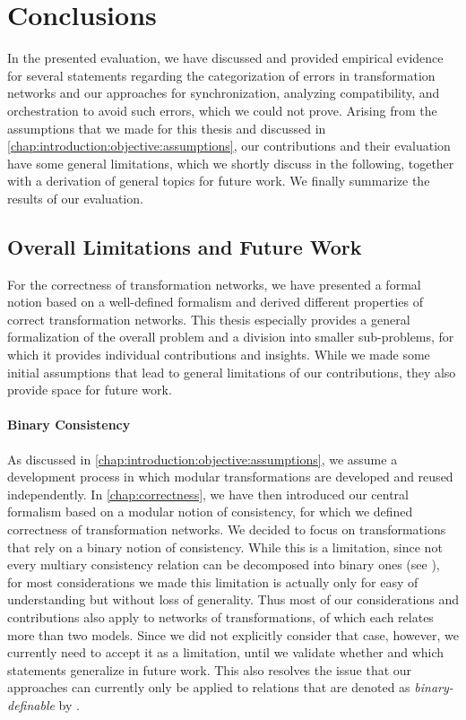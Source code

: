 \section{Conclusions}

In the presented evaluation, we have discussed and provided empirical evidence for several statements regarding the categorization of errors in transformation networks and our approaches for synchronization, analyzing compatibility, and orchestration to avoid such errors, which we could not prove.
Arising from the assumptions that we made for this thesis and discussed in \autoref{chap:introduction:objective:assumptions}, our contributions and their evaluation have some general limitations, which we shortly discuss in the following, together with a derivation of general topics for future work.
We finally summarize the results of our evaluation.


\subsection{Overall Limitations and Future Work}

For the correctness of transformation networks, we have presented a formal notion based on a well-defined formalism and derived different properties of correct transformation networks.
This thesis especially provides a general formalization of the overall problem and a division into smaller sub-problems, for which it provides individual contributions and insights.
While we made some initial assumptions that lead to general limitations of our contributions, they also provide space for future work.

\paragraph{Binary Consistency}
As discussed in \autoref{chap:introduction:objective:assumptions}, we assume a development process in which modular transformations are developed and reused independently.
In \autoref{chap:correctness}, we have then introduced our central formalism based on a modular notion of consistency, for which we defined correctness of transformation networks.
We decided to focus on transformations that rely on a binary notion of consistency.
While this is a limitation, since not every multiary consistency relation can be decomposed into binary ones (see \cite{stevens2020BidirectionalTransformationLarge-SoSym}), for most considerations we made this limitation is actually only for easy of understanding but without loss of generality.
Thus most of our considerations and contributions also apply to networks of transformations, of which each relates more than two models.
Since we did not explicitly consider that case, however, we currently need to accept it as a limitation, until we validate whether and which statements generalize in future work.
This also resolves the issue that our approaches can currently only be applied to relations that are denoted as \emph{binary-definable} by \textcite{stevens2020BidirectionalTransformationLarge-SoSym}.

